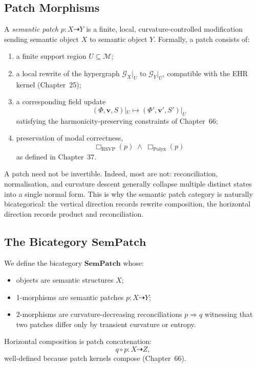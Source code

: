 \subsection{Patch Morphisms}
\label{subsec:79-1-patch-morphisms}

A \emph{semantic patch} $p:X\dasharrow Y$ is a finite, local, curvature-controlled modification
sending semantic object $X$ to semantic object $Y$.
Formally, a patch consists of:
\begin{enumerate}
\item a finite support region $U\subseteq\mathcal{M}$;
\item a local rewrite of the hypergraph $\mathcal{G}_X|_U$ to $\mathcal{G}_Y|_U$,  
      compatible with the EHR kernel (Chapter~25);
\item a corresponding field update
      \[
      (\Phi,\mathbf{v},S)|_U \longmapsto (\Phi',\mathbf{v}',S')|_U
      \]
      satisfying the harmonicity-preserving constraints of Chapter~66;
\item preservation of modal correctness,
      \[
      \Box_{\mathrm{RSVP}}(p)\;\wedge\;\Box_{\mathrm{Polyx}}(p)
      \]
      as defined in Chapter~37.
\end{enumerate}

A patch need not be invertible.  
Indeed, most are not: reconciliation, normalisation, and curvature descent
generally collapse multiple distinct states into a single normal form.
This is why the semantic patch category is naturally bicategorical:
the vertical direction records rewrite composition,
the horizontal direction records product and reconciliation.

\subsection{The Bicategory \texorpdfstring{$\mathbf{SemPatch}$}{SemPatch}}
\label{subsec:79-1-bicategory}

We define the bicategory $\mathbf{SemPatch}$ whose:
\begin{itemize}
\item objects are semantic structures $X$;
\item 1-morphisms are semantic patches $p:X\dasharrow Y$;
\item 2-morphisms are curvature-decreasing reconciliations
      $p\Rightarrow q$
      witnessing that two patches differ only by transient curvature or entropy.
\end{itemize}

Horizontal composition is patch concatenation:
\[
q\circ p : X\dasharrow Z,
\]
well-defined because patch kernels compose (Chapter~66).

